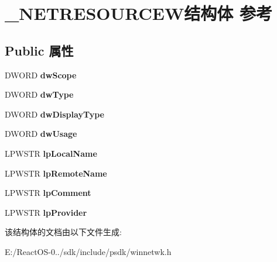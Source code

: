 \hypertarget{struct___n_e_t_r_e_s_o_u_r_c_e_w}{}\section{\+\_\+\+N\+E\+T\+R\+E\+S\+O\+U\+R\+C\+E\+W结构体 参考}
\label{struct___n_e_t_r_e_s_o_u_r_c_e_w}
\subsection*{Public 属性}
\begin{DoxyCompactItemize}
\item 
\mbox{\label{struct___n_e_t_r_e_s_o_u_r_c_e_w_a80d4c3149677d7a27f2379014bf27ae7}} 
D\+W\+O\+RD {\bfseries dw\+Scope}
\item 
\mbox{\label{struct___n_e_t_r_e_s_o_u_r_c_e_w_a125e5583eaf4bedeed48467301ef3a69}} 
D\+W\+O\+RD {\bfseries dw\+Type}
\item 
\mbox{\label{struct___n_e_t_r_e_s_o_u_r_c_e_w_a2524acd96d01fa735b474394e08d702f}} 
D\+W\+O\+RD {\bfseries dw\+Display\+Type}
\item 
\mbox{\label{struct___n_e_t_r_e_s_o_u_r_c_e_w_a643e412cf4a89f8734e39819c58090d6}} 
D\+W\+O\+RD {\bfseries dw\+Usage}
\item 
\mbox{\label{struct___n_e_t_r_e_s_o_u_r_c_e_w_a9fb44e9f16b2380c7cd367faf5ac7059}} 
L\+P\+W\+S\+TR {\bfseries lp\+Local\+Name}
\item 
\mbox{\label{struct___n_e_t_r_e_s_o_u_r_c_e_w_acece94439e1dbbb147696030498f2b60}} 
L\+P\+W\+S\+TR {\bfseries lp\+Remote\+Name}
\item 
\mbox{\label{struct___n_e_t_r_e_s_o_u_r_c_e_w_a2b109e7012ea355a6f3e5e3e227dc45a}} 
L\+P\+W\+S\+TR {\bfseries lp\+Comment}
\item 
\mbox{\label{struct___n_e_t_r_e_s_o_u_r_c_e_w_ac99539f4b09e0f7efc48483d430c041b}} 
L\+P\+W\+S\+TR {\bfseries lp\+Provider}
\end{DoxyCompactItemize}


该结构体的文档由以下文件生成\+:\begin{DoxyCompactItemize}
\item 
E\+:/\+React\+O\+S-\/0../sdk/include/psdk/winnetwk.\+h\end{DoxyCompactItemize}
